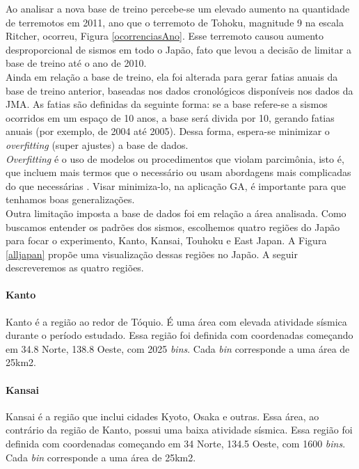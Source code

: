 Ao analisar a nova base de treino percebe-se um elevado aumento na quantidade de terremotos em 2011, ano que o terremoto de Tohoku, magnitude 9 na escala Ritcher, ocorreu, Figura \ref{ocorrenciasAno}. Esse terremoto causou aumento desproporcional de sismos em todo o Japão, fato que levou a decisão de limitar a base de treino até o ano de 2010.\\

Ainda em relação a base de treino, ela foi alterada para gerar fatias anuais da base de treino anterior, baseadas nos dados cronológicos disponíveis nos dados da JMA. As fatias são definidas da seguinte forma: se a base refere-se a sismos ocorridos em um espaço de 10 anos, a base será divida por 10, gerando fatias anuais (por exemplo, de 2004 até 2005). Dessa forma, espera-se minimizar o {\it overfitting} (super ajustes) a base de dados.\\

{\it Overfitting} é o uso de modelos ou procedimentos que violam parcimônia, isto é, que incluem mais termos que o necessário ou usam abordagens mais complicadas do que necessárias \cite{hawkins2004problem}. Visar minimiza-lo, na aplicação GA, é importante para que tenhamos boas generalizações.\\

Outra limitação imposta a base de dados foi em relação a área analisada. Como buscamos entender os padrões dos sismos, escolhemos quatro regiões do Japão para focar o experimento, Kanto, Kansai, Touhoku e East Japan. A Figura \ref{alljapan} propõe uma visualização dessas regiões no Japão. A seguir descreveremos as quatro regiões.\\

\paragraph{Kanto} Kanto é a região ao redor de Tóquio. É uma área com elevada atividade sísmica durante o período estudado. Essa região foi definida com coordenadas começando em 34.8 Norte, 138.8 Oeste, com  2025 {\it bins}. Cada {\it bin} corresponde a uma área de 25km2.\\

\paragraph{Kansai} Kansai é a região que inclui cidades Kyoto, Osaka e outras. Essa área, ao contrário da região de Kanto, possui uma baixa atividade sísmica. Essa região foi definida com coordenadas começando em 34 Norte, 134.5 Oeste, com  1600 {\it bins}. Cada {\it bin} corresponde a uma área de 25km2.\\

